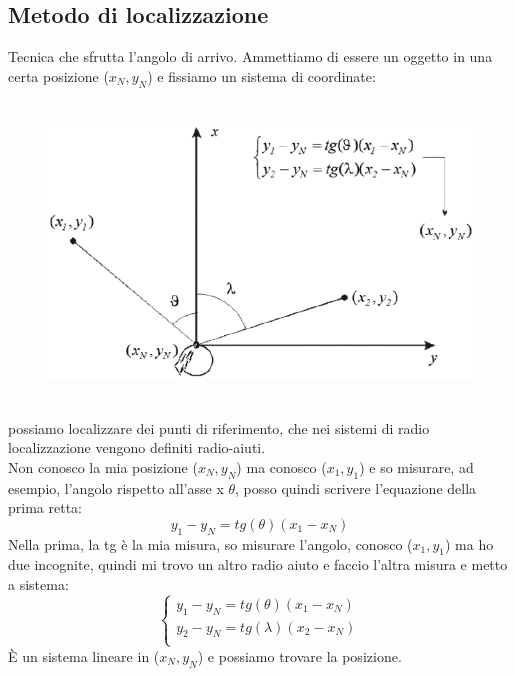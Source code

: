 \documentclass[oneside, 12pt]{extbook}
\begin{document}
\subsection{Metodo di localizzazione}
Tecnica che sfrutta l'angolo di arrivo. Ammettiamo di essere un oggetto in una certa posizione ($x_N, y_N$) e fissiamo un sistema di coordinate:\\\\
\begin{figure}[!h]
	\includegraphics[scale=0.3]{immagini/localization/aoa.png}
\end{figure}\\
possiamo localizzare dei punti di riferimento, che nei sistemi di radio localizzazione vengono definiti radio-aiuti.\\
Non conosco la mia posizione ($x_N, y_N$) ma conosco ($x_1, y_1$) e so misurare, ad esempio, l'angolo rispetto all'asse x $\theta$, posso quindi scrivere l'equazione della prima retta:
\begin{equation}
	y_1 - y_N = tg(\theta)(x_1 - x_N)
\end{equation}
Nella prima, la tg è la mia misura, so misurare l'angolo, conosco ($x_1, y_1$) ma ho due incognite, quindi mi trovo un altro radio aiuto e faccio l'altra misura e metto a sistema:
\begin{equation}
	\begin{cases}
		y_1 - y_N = tg(\theta)(x_1 - x_N)\\
		y_2 - y_N = tg(\lambda)(x_2 - x_N)\\
	\end{cases}
\end{equation}
È un sistema lineare in ($x_N, y_N$) e possiamo trovare la posizione.\\\\
\end{document}
